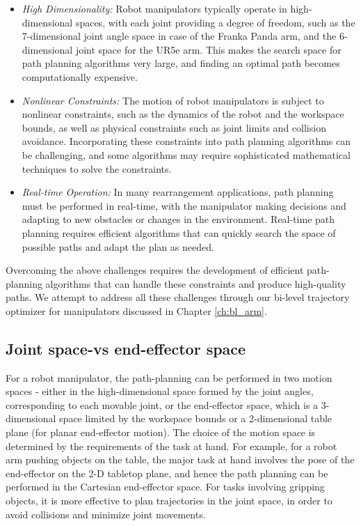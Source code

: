 \begin{itemize}
    \item \textit{High Dimensionality:} Robot manipulators typically operate in high-dimensional spaces, with each joint providing a degree of freedom, such as the 7-dimensional joint angle space in case of the Franka Panda arm, and the 6-dimensional joint space for the UR5e arm. This makes the search space for path planning algorithms very large, and finding an optimal path becomes computationally expensive.
    \item \textit{Nonlinear Constraints:}  The motion of robot manipulators is subject to nonlinear constraints, such as the dynamics of the robot and the workspace bounds, as well as physical constraints such as joint limits and collision avoidance. Incorporating these constraints into path planning algorithms can be challenging, and some algorithms may require sophisticated mathematical techniques to solve the constraints.
    \item \textit{Real-time Operation:}  In many rearrangement applications, path planning must be performed in real-time, with the manipulator making decisions and adapting to new obstacles or changes in the environment. Real-time path planning requires efficient algorithms that can quickly search the space of possible paths and adapt the plan as needed.
\end{itemize}

Overcoming the above challenges requires the development of efficient path-planning algorithms that can handle these constraints and produce high-quality paths. We attempt to address all these challenges through our bi-level trajectory optimizer for manipulators discussed in Chapter \ref{ch:bl_arm}.

\subsection{Joint space-vs end-effector space}

For a robot manipulator, the path-planning can be performed in two motion spaces - either in the high-dimensional space formed by the joint angles, corresponding to each movable joint, or the end-effector space, which is a 3-dimensional space limited by the workspace bounds  or a 2-dimensional table plane (for planar end-effector motion). The choice of the motion space is determined by the requirements of the task at hand. For example, for a robot arm pushing objects on the table, the major task at hand involves the pose of the end-effector on the 2-D tabletop plane, and hence the path planning can be performed in the Cartesian end-effector space. For tasks involving gripping objects, it is more effective to plan trajectories in the joint space, in order to avoid collisions and minimize joint movements. 

